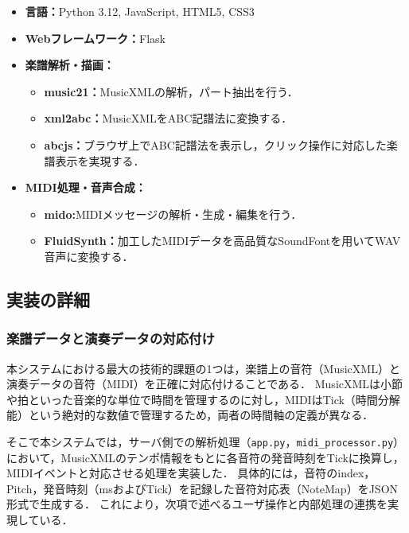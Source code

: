 \begin{itemize}
	\item \textbf{言語：}Python 3.12, JavaScript, HTML5, CSS3
	\item \textbf{Webフレームワーク：}Flask
	\item \textbf{楽譜解析・描画：}
	      \begin{itemize}
		      \item \textbf{music21}\cite{music21}\textbf{：}MusicXMLの解析，パート抽出を行う．
		      \item \textbf{xml2abc}\cite{xml2abc}\textbf{：}MusicXMLをABC記譜法に変換する．
		      \item \textbf{abcjs}\cite{abcjs}\textbf{：}ブラウザ上でABC記譜法を表示し，クリック操作に対応した楽譜表示を実現する．
	      \end{itemize}
	\item \textbf{MIDI処理・音声合成：}
	      \begin{itemize}
		      \item \textbf{mido}\cite{mido}\textbf{:}MIDIメッセージの解析・生成・編集を行う．
		      \item \textbf{FluidSynth}\textbf{：}加工したMIDIデータを高品質なSoundFontを用いてWAV音声に変換する．
	      \end{itemize}
\end{itemize}

\subsection{実装の詳細}

\subsubsection{楽譜データと演奏データの対応付け}
本システムにおける最大の技術的課題の1つは，楽譜上の音符（MusicXML）と演奏データの音符（MIDI）を正確に対応付けることである．
MusicXMLは小節や拍といった音楽的な単位で時間を管理するのに対し，MIDIはTick（時間分解能）という絶対的な数値で管理するため，両者の時間軸の定義が異なる．

そこで本システムでは，サーバ側での解析処理（\texttt{app.py}，\texttt{midi\_processor.py}）において，MusicXMLのテンポ情報をもとに各音符の発音時刻をTickに換算し，MIDIイベントと対応させる処理を実装した．
具体的には，音符のindex，Pitch，発音時刻（msおよびTick）を記録した音符対応表（NoteMap）をJSON形式で生成する．
これにより，次項で述べるユーザ操作と内部処理の連携を実現している．

